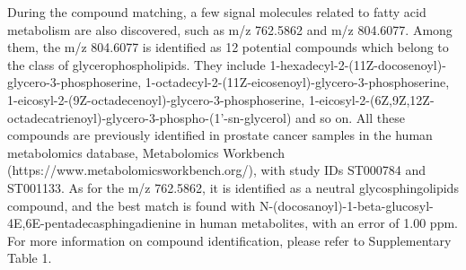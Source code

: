 \documentclass[journal=jacsat,manuscript=article]{achemso}
\begin{document}
During the compound matching, a few signal molecules related to 
fatty acid metabolism are also discovered, such as m/z 762.5862 and m/z 804.6077. 
Among them, the m/z 804.6077 
is identified as 12 potential compounds which belong to the class 
of glycerophospholipids. They include 
1-hexadecyl-2-(11Z-docosenoyl)-glycero-3-phosphoserine, 
1-octadecyl-2-(11Z-eicosenoyl)-glycero-3-phosphoserine,
1-eicosyl-2-(9Z-octadecenoyl)-glycero-3-phosphoserine,
1-eicosyl-2-(6Z,9Z,12Z-octadecatrienoyl)-glycero-3-phospho-(1'-sn-glycerol) and so on. 
All these compounds are 
previously identified in prostate cancer samples in the human metabolomics database, 
Metabolomics Workbench (https://www.metabolomicsworkbench.org/), 
with study IDs ST000784 and ST001133. 
As for the m/z 762.5862, it is identified as a neutral glycosphingolipids compound, and the 
best match is found with N-(docosanoyl)-1-beta-glucosyl-4E,6E-pentadecasphingadienine in human 
metabolites, with an error of 1.00 ppm. 
For more information on compound identification, please refer to Supplementary Table 1.
\end{document}
